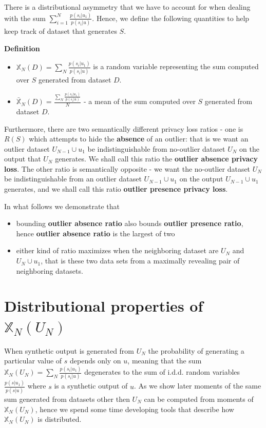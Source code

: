 \documentclass[11pt]{article}
\begin{document}
There is a distributional asymmetry that we have to account for when dealing with the sum $\sum_{i=1}^N  \frac{ p(s_i | u_1) } { p(s_i | u) }$.  Hence, we define the following quantities to help keep track of dataset that generates $S$.


\textbf{Definition}
\begin{itemize}
\item $\mathbb{X}_N(D) = \sum_N  \frac{ p(s_i | u_1) } { p(s_i | u)}$ is a random variable representing the sum computed over $S$ generated from dataset $D$.
\item $\bar{\mathbb{X}}_N(D) = \frac{\sum_N  \frac{ p(s_i | u_1) } { p(s_i | u)} }{N}$ - a mean of the sum computed over $S$ generated from dataset $D$.
\end{itemize}

Furthermore, there are two semantically different privacy loss ratios - one is $R(S)$ which attempts to hide the \textbf{absence} of an outlier: that is  we want an outlier dataset  $U_{N-1} \cup u_1$ be indistinguishable from  no-outlier dataset $U_N$ on the output that $U_N$ generates.  We shall call this ratio the \textbf{outlier absence privacy loss}.   The other ratio is semantically opposite - we want the no-outlier dataset $U_N$ be indistinguishable from an outlier dataset  $U_{N-1} \cup u_1$ on the output  $U_{N-1} \cup u_1$ generates, and we shall call this ratio \textbf{outlier presence privacy loss}.

In what follows we demonstrate that
\begin{itemize}
\item bounding \textbf{outlier absence ratio} also bounds  \textbf{outlier presence ratio}, hence \textbf{outlier absence ratio} is the largest of two
\item either kind of ratio maximizes when the neighboring dataset are $U_N$ and  $U_N \cup u_1$, that is these two data sets from a maximally revealing pair of neighboring datasets. 
\end{itemize}

\section{Distributional properties of  $\mathbb{X}_N(U_N)$}  

When synthetic output is generated from $U_N$ the probability of generating a particular value of $s$ depends only on $u$, meaning that the sum  $\mathbb{X}_N(U_N) = \sum_N  \frac{ p(s_i | u_1) } { p(s_i | u)}$ degenerates to the sum of i.d.d. random variables $\frac{ p(s | u_1) } { p(s | u)}$ where $s$ is a synthetic output of $u$.  As we show later moments of the same sum generated from datasets other then $U_N$ can be computed from moments of $\mathbb{X}_N(U_N)$, hence we spend some time developing tools that describe how  $\mathbb{X}_N(U_N)$ is distributed.
\end{document}

